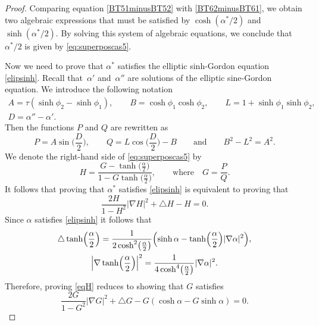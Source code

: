 \documentclass[pdftex]{sigma}
\numberwithin{equation}{section}
\begin{document}
\begin{proof}
Comparing equation \eqref{BT51minusBT52} with \eqref{BT62minusBT61}, we obtain two algebraic
expressions that must be satisfied by $\cosh(\alpha^*/2)$ and $\sinh(\alpha^*/2)$.
By solving this system of algebraic equations, we conclude that $\alpha^*/2$ is given by
\eqref{eq:superposcas5}.

Now we need to prove that $\alpha^*$ satisfies the elliptic sinh-Gordon equation \eqref{elipsinh}.
Recall that~$\alpha'$ and~$\alpha''$ are solutions of the elliptic sine-Gordon equation.
We introduce the following notation
\begin{gather}
A=\tau(\sinh\phi_2-\sinh\phi_1),\qquad B=\cosh\phi_1\cosh\phi_2,\qquad L=1+\sinh\phi_1\sinh\phi_2, \nonumber\\
 D=\alpha''-\alpha'.\label{ABLD}
\end{gather}
Then the functions $P$ and $Q$ are rewritten as
\begin{equation*}%
P=A\sin\biggl(\frac{D}{2}\biggr),\qquad Q=L\cos\biggl(\frac{D}{2}\biggr)-B \qquad \mbox {and}\qquad B^2-L^2=A^2.
\end{equation*}
We denote the right-hand side of \eqref{eq:superposcas5} by
\begin{equation*}%
H=\frac{G-\tanh\bigl(\frac{\alpha}{2}\bigr)}{1-G\tanh\bigl(\frac{\alpha}{2}\bigr)}, \qquad \mbox{where}\quad G=\frac{P}{Q}.
\end{equation*}
It follows that proving that $\alpha^*$ satisfies \eqref{elipsinh} is equivalent to proving that
\begin{equation}\label{eqH}
\frac{2H}{1-H^2}|\nabla H|^2+ \triangle H-H=0.
\end{equation}
Since $\alpha$ satisfies \eqref{elipsinh} it follows that
\begin{gather*}
\triangle \tanh \Bigl(\frac{\alpha}{2}\Bigr)= \frac{1}{2\cosh^2\bigl(\frac{\alpha}{2}\bigr)}\Bigl(\sinh \alpha-\tanh\Bigl(\frac{\alpha}{2}\Bigr)|\nabla\alpha|^2\Bigr), \\
\Bigl|\nabla\tanh\Bigl(\frac{\alpha}{2}\Bigr)\Bigr|^2=\frac{1}{4\cosh^4 \bigl(\frac{\alpha}{2}\bigr)}
|\nabla \alpha|^2.
\end{gather*}
Therefore, proving \eqref{eqH} reduces to showing
that $G$ satisfies
\begin{equation}\label{eqG}
\frac{2G}{1-G^2}|\nabla G|^2+\triangle G-G(\cosh \alpha-G\sinh\alpha)=0.
\end{equation}


\end{proof}
\end{document}
